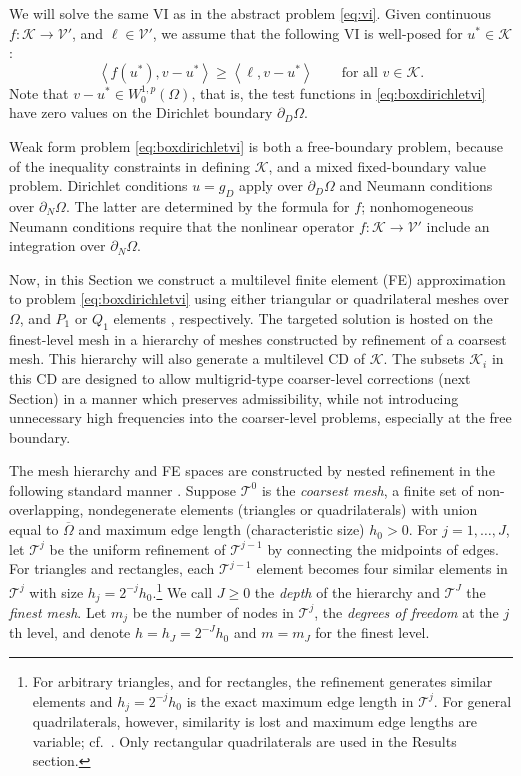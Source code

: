 \documentclass[letterpaper,final,12pt,reqno]{amsart}
\theoremstyle{cstyle}
\theoremstyle{cstyle*}
\theoremstyle{dstyle}
\numberwithin{equation}{section}
\numberwithin{figure}{section}
\numberwithin{table}{section}
\numberwithin{theorem}{section}
\newcommand{\cK}{\mathcal{K}}
\newcommand{\cV}{\mathcal{V}}
\newcommand{\ip}[2]{\left<#1,#2\right>}
\begin{document}
We will solve the same VI as in the abstract problem \eqref{eq:vi}.  Given continuous $f:\cK \to \cV'$, and $\ell \in \cV'$, we assume that the following VI is well-posed for $u^*\in \cK$:
\begin{equation}
\ip{f(u^*)}{v-u^*} \ge \ip{\ell}{v-u^*} \qquad \text{for all } v\in \cK. \label{eq:boxdirichletvi}
\end{equation}
Note that $v-u^* \in W_0^{1,p}(\Omega)$, that is, the test functions in \eqref{eq:boxdirichletvi} have zero values on the Dirichlet boundary $\partial_D\Omega$.

Weak form problem \eqref{eq:boxdirichletvi} is both a free-boundary problem, because of the inequality constraints in defining $\cK$, and a mixed fixed-boundary value problem.   Dirichlet conditions $u=g_D$ apply over $\partial_D\Omega$ and Neumann conditions over $\partial_N \Omega$.  The latter are determined by the formula for $f$; nonhomogeneous Neumann conditions require that the nonlinear operator $f:\cK\to\cV'$ include an integration over $\partial_N\Omega$.

Now, in this Section we construct a multilevel finite element (FE) approximation to problem \eqref{eq:boxdirichletvi} using either triangular or quadrilateral meshes over $\Omega$, and $P_1$ or $Q_1$ elements \cite{Elmanetal2014}, respectively.  The targeted solution is hosted on the finest-level mesh in a hierarchy of meshes constructed by refinement of a coarsest mesh.   This hierarchy will also generate a multilevel CD of $\cK$.  The subsets $\cK_i$ in this CD are designed to allow multigrid-type coarser-level corrections (next Section) in a manner which preserves admissibility, while not introducing unnecessary high frequencies into the coarser-level problems, especially at the free boundary.

The mesh hierarchy and FE spaces are constructed by nested refinement in the following standard manner \cite{Elmanetal2014}.  Suppose $\mathcal{T}^0$ is the \emph{coarsest mesh}, a finite set of non-overlapping, nondegenerate elements (triangles or quadrilaterals) with union equal to $\overline{\Omega}$ and maximum edge length (characteristic size) $h_0>0$.  For $j=1,\dots,J$, let $\mathcal{T}^j$ be the uniform refinement of $\mathcal{T}^{j-1}$ by connecting the midpoints of edges.  For triangles and rectangles, each $\mathcal{T}^{j-1}$ element becomes four similar elements in $\mathcal{T}^j$ with size $h_j = 2^{-j} h_0$.\footnote{For arbitrary triangles, and for rectangles, the refinement generates similar elements and $h_j=2^{-j}h_0$ is the exact maximum edge length in $\mathcal{T}^j$.  For general quadrilaterals, however, similarity is lost and maximum edge lengths are variable; cf.~\cite{Zhang2004}.  Only rectangular quadrilaterals are used in the Results section.}  We call $J\ge 0$ the \emph{depth} of the hierarchy and $\mathcal{T}^J$ the \emph{finest mesh}.  Let $m_j$ be the number of nodes in $\mathcal{T}^j$, the \emph{degrees of freedom} at the $j$th level, and denote $h=h_J=2^{-J} h_0$ and $m=m_J$ for the finest level.
\end{document}
